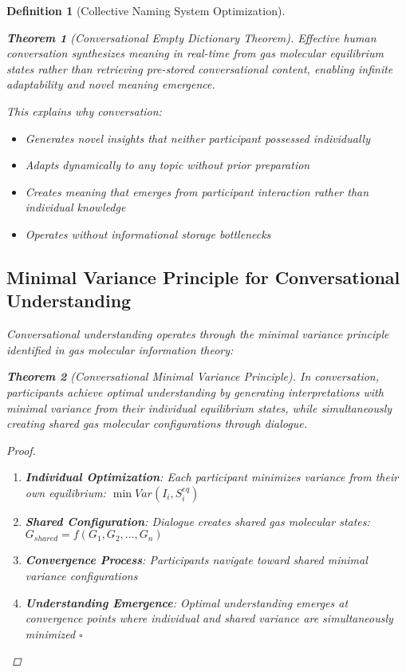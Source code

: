 \documentclass[12pt]{article}
\newtheorem{theorem}{Theorem}
\newtheorem{definition}{Definition}
\begin{document}
\begin{definition}[Collective Naming System Optimization]
\begin{theorem}[Conversational Empty Dictionary Theorem]
Effective human conversation synthesizes meaning in real-time from gas molecular equilibrium states rather than retrieving pre-stored conversational content, enabling infinite adaptability and novel meaning emergence.
\end{theorem}

This explains why conversation:
\begin{itemize}
\item Generates novel insights that neither participant possessed individually
\item Adapts dynamically to any topic without prior preparation
\item Creates meaning that emerges from participant interaction rather than individual knowledge
\item Operates without informational storage bottlenecks
\end{itemize}

\subsection{Minimal Variance Principle for Conversational Understanding}

Conversational understanding operates through the minimal variance principle identified in gas molecular information theory:

\begin{theorem}[Conversational Minimal Variance Principle]
In conversation, participants achieve optimal understanding by generating interpretations with minimal variance from their individual equilibrium states, while simultaneously creating shared gas molecular configurations through dialogue.
\end{theorem}

\begin{proof}
\begin{enumerate}
\item \textbf{Individual Optimization}: Each participant minimizes variance from their own equilibrium: $\min Var(I_i, S_i^{eq})$
\item \textbf{Shared Configuration}: Dialogue creates shared gas molecular states: $G_{shared} = f(G_1, G_2, ..., G_n)$
\item \textbf{Convergence Process}: Participants navigate toward shared minimal variance configurations
\item \textbf{Understanding Emergence}: Optimal understanding emerges at convergence points where individual and shared variance are simultaneously minimized $\square$
\end{enumerate}
\end{proof}


\end{definition}
\end{document}
